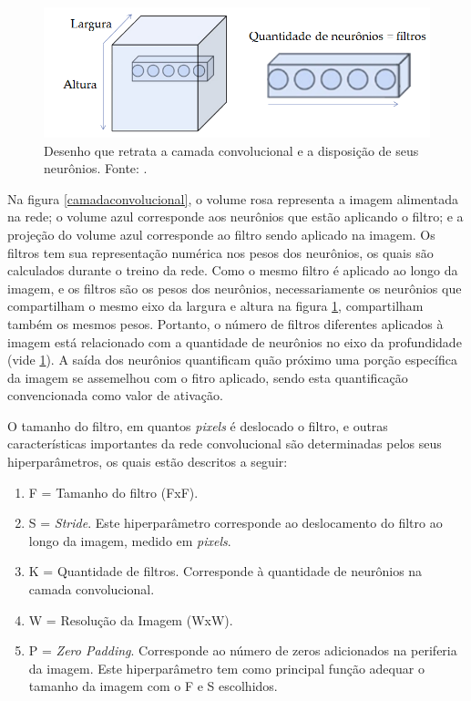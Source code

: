 \documentclass[
	12pt,				%
	oneside,			%
	a4paper,			%
	english,			%
	french,				%
	spanish,			%
	brazil,				%
	]{abntex2}
\begin{document}
\begin{figure}[H]
	\centering
	\includegraphics[width=.8\textwidth]{imagens/camadaconvolucional2}
	\caption{Desenho que retrata a camada convolucional e a disposição de seus neurônios. Fonte: \cite{ref3}.}
	\label{camadaconvolucional2}
\end{figure} 

Na figura \ref{camadaconvolucional}, o volume rosa representa a imagem alimentada na rede; o volume azul corresponde aos neurônios que estão aplicando o filtro; e a projeção do volume azul corresponde ao filtro sendo aplicado na imagem. Os filtros tem sua representação numérica nos pesos dos neurônios, os quais são calculados durante o treino da rede. Como o mesmo filtro é aplicado ao longo da imagem, e os filtros são os pesos dos neurônios, necessariamente os neurônios que compartilham o mesmo eixo da largura e altura na figura \ref{camadaconvolucional2}, compartilham também os mesmos pesos. Portanto, o número de filtros diferentes aplicados à imagem está relacionado com a quantidade de neurônios no eixo da profundidade (vide \ref{camadaconvolucional2}). A saída dos neurônios quantificam quão próximo uma porção específica da imagem se assemelhou com o fitro aplicado, sendo esta quantificação convencionada como valor de ativação.

O tamanho do filtro, em quantos \textit{pixels} é deslocado o filtro, e outras características importantes da rede convolucional são determinadas pelos seus hiperparâmetros, os quais estão descritos a seguir:
\begin{enumerate}
	\item F = Tamanho do filtro (FxF).
	\item S = \textit{Stride}. Este hiperparâmetro corresponde ao deslocamento do filtro ao longo da imagem, medido em \textit{pixels}.
	\item K = Quantidade de filtros. Corresponde à quantidade de neurônios na camada convolucional.
	\item W = Resolução da Imagem (WxW).
	\item P = \textit{Zero Padding}. Corresponde ao número de zeros adicionados na periferia da imagem. Este hiperparâmetro tem como principal função adequar o tamanho da imagem com o F e S escolhidos.
\end{enumerate}
\end{document}
